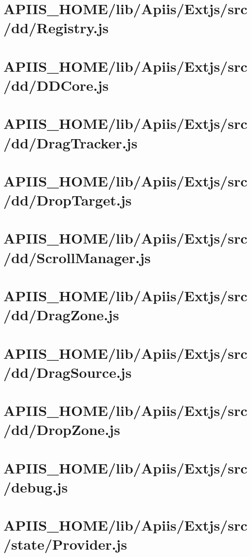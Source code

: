 \section{APIIS\_HOME/lib/Apiis/Extjs/src/dd/Registry.js} 
\section{APIIS\_HOME/lib/Apiis/Extjs/src/dd/DDCore.js} 
\section{APIIS\_HOME/lib/Apiis/Extjs/src/dd/DragTracker.js} 
\section{APIIS\_HOME/lib/Apiis/Extjs/src/dd/DropTarget.js} 
\section{APIIS\_HOME/lib/Apiis/Extjs/src/dd/ScrollManager.js} 
\section{APIIS\_HOME/lib/Apiis/Extjs/src/dd/DragZone.js} 
\section{APIIS\_HOME/lib/Apiis/Extjs/src/dd/DragSource.js} 
\section{APIIS\_HOME/lib/Apiis/Extjs/src/dd/DropZone.js} 
\section{APIIS\_HOME/lib/Apiis/Extjs/src/debug.js} 
\section{APIIS\_HOME/lib/Apiis/Extjs/src/state/Provider.js} 
